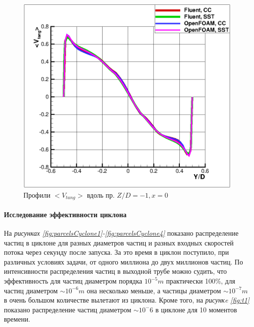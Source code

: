 \begin{figure}[h]
	\hspace{0.5em}
	\begin{minipage}{0.475\linewidth}
		\includegraphics[scale=0.66]{tangentialCyclone2}
		\caption{Профили $<V_{tang}>$ вдоль пр. $Z/D=-1, x=0$}
		\label{fig:tangentialCyclone2}
	\end{minipage}
\end{figure}
\clearpage

\paragraph{Исследование эффективности циклона\\}

На \textit{рисунках \ref{fig:parcelsCyclone1}-\ref{fig:parcelsCyclone4}} показано распределение частиц в циклоне для разных диаметров частиц и разных входных скоростей потока через секунду после запуска. За это время в циклон поступило, при различных условиях задачи, от одного миллиона до двух миллионов частиц. По интенсивности распределения частиц в выходной трубе можно судить, что эффективность для частиц диаметром порядка $10^{-5}m$ практически 100\%, для частиц диаметром $\sim 10^{-6}m$ она несколько меньше, а частицы диаметром $\sim 10^{-7}m$ в очень большом количестве вылетают из циклона. Кроме того, на \textit{рисункe \ref{fig:t1}} показано распределение частиц диаметром $\sim 10^-6$ в циклоне для 10 моментов времени.

